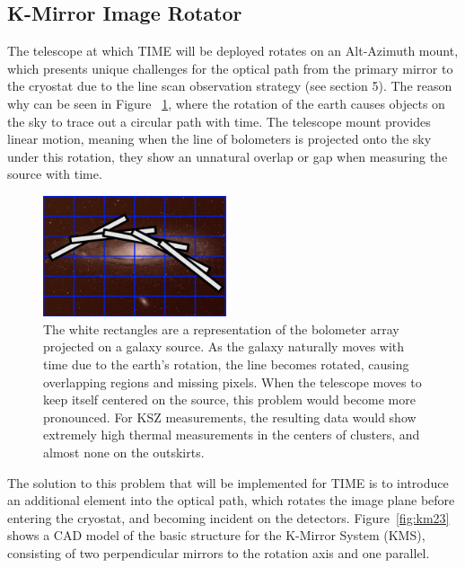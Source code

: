 \documentclass[manuscript]{aastex}
\begin{document}
\subsection{K-Mirror Image Rotator}
The telescope at which TIME will be deployed rotates on an Alt-Azimuth mount, which presents unique challenges for the optical path from the primary mirror to the cryostat due to the line scan observation strategy (see section 5). The reason why can be seen in Figure ~\ref{fig:km1}, where the rotation of the earth causes objects on the sky to trace out a circular path with time. The telescope mount provides linear motion, meaning when the line of bolometers is projected onto the sky under this rotation, they show an unnatural overlap or gap when measuring the source with time.
\begin{figure}
\vspace{-0.8cm}
  \begin{center}
    \includegraphics[width=0.48\textwidth]{km1.png}
  \end{center}
  \caption[Diagram of Bolometer De-rotation on Source from Alt-Az Mount.]{The white rectangles are a representation of the bolometer array projected on a galaxy source. As the galaxy naturally moves with time due to the earth's rotation, the line becomes rotated, causing overlapping regions and missing pixels. When the telescope moves to keep itself centered on the source, this problem would become more pronounced. For KSZ measurements, the resulting data would show extremely high thermal measurements in the centers of clusters, and almost none on the outskirts.}
  \label{fig:km1}
\end{figure}
The solution to this problem that will be implemented for TIME is to introduce an additional element into the optical path, which rotates the image plane before entering the cryostat, and becoming incident on the detectors. Figure~\ref{fig:km23} shows a CAD model of the basic structure for the K-Mirror System (KMS), consisting of two perpendicular mirrors to the rotation axis and one parallel.
\end{document}
